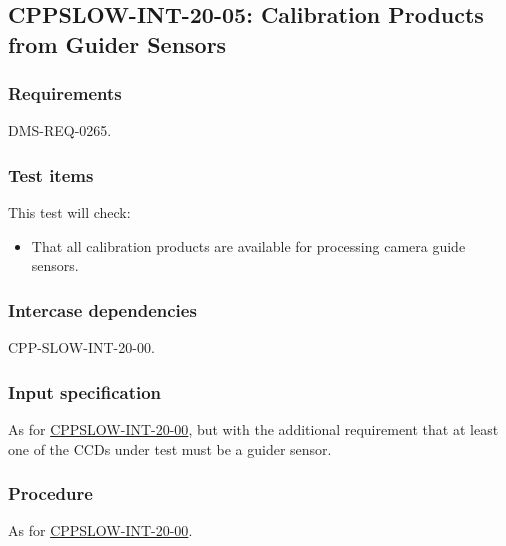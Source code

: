 \subsection{CPPSLOW-INT-20-05: Calibration Products from Guider Sensors}
\label{cppslow-int-20-05}

\subsubsection{Requirements}

DMS-REQ-0265.

\subsubsection{Test items}

This test will check:

\begin{itemize}

  \item{That all calibration products are available for processing camera
  guide sensors.}

\end{itemize}

\subsubsection{Intercase dependencies}

CPP-SLOW-INT-20-00.

\subsubsection{Input specification}

As for \hyperref[cppslow-int-20-00]{CPPSLOW-INT-20-00}, but with the
additional requirement that at least one of the CCDs under test must be a
guider sensor.

\subsubsection{Procedure}

As for \hyperref[cppslow-int-20-00]{CPPSLOW-INT-20-00}.
